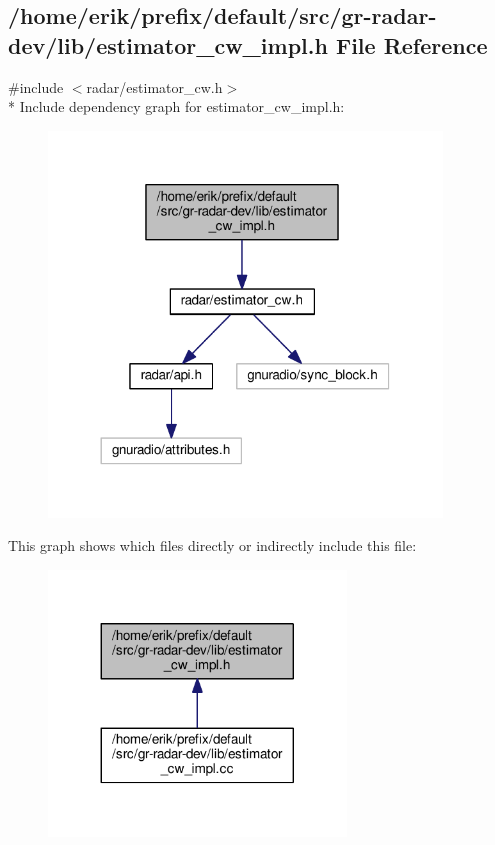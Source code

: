 \subsection{/home/erik/prefix/default/src/gr-\/radar-\/dev/lib/estimator\+\_\+cw\+\_\+impl.h File Reference}
\label{estimator__cw__impl_8h}
{\ttfamily \#include $<$radar/estimator\+\_\+cw.\+h$>$}\\*
Include dependency graph for estimator\+\_\+cw\+\_\+impl.\+h\+:
\nopagebreak
\begin{figure}[H]
\begin{center}
\leavevmode
\includegraphics[width=296pt]{d8/d19/estimator__cw__impl_8h__incl}
\end{center}
\end{figure}
This graph shows which files directly or indirectly include this file\+:
\nopagebreak
\begin{figure}[H]
\begin{center}
\leavevmode
\includegraphics[width=224pt]{de/da6/estimator__cw__impl_8h__dep__incl}
\end{center}
\end{figure}
